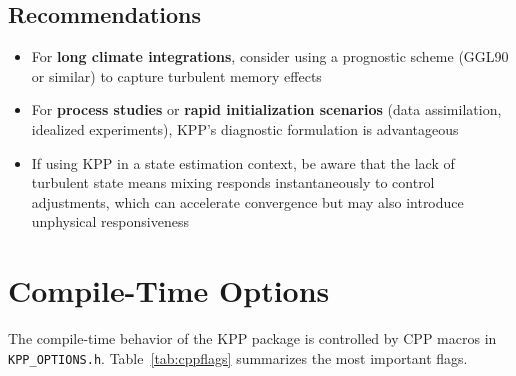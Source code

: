 \documentclass[12pt,letterpaper]{article}
\begin{document}
\subsection{Recommendations}

\begin{itemize}[leftmargin=*]
  \item For \textbf{long climate integrations}, consider using a prognostic scheme
        (GGL90 or similar) to capture turbulent memory effects
  \item For \textbf{process studies} or \textbf{rapid initialization scenarios}
        (data assimilation, idealized experiments), KPP's diagnostic formulation is
        advantageous
  \item If using KPP in a state estimation context, be aware that the lack of
        turbulent state means mixing responds instantaneously to control adjustments,
        which can accelerate convergence but may also introduce unphysical
        responsiveness
\end{itemize}

\section{Compile-Time Options}  
  
The compile-time behavior of the KPP package is controlled by CPP  
macros in \texttt{KPP\_OPTIONS.h}. Table~\ref{tab:cppflags} summarizes  
the most important flags.  
  
\end{document}
